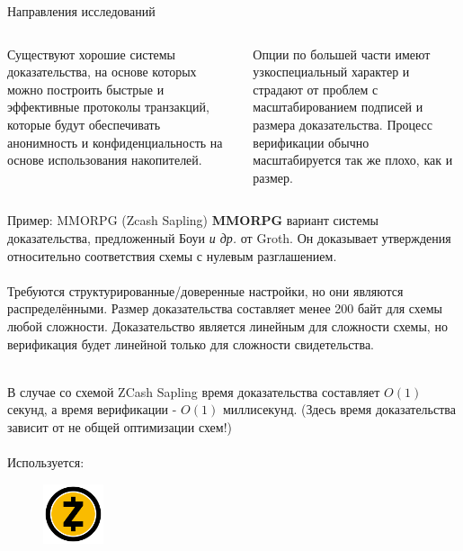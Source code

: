 \documentclass[aspectratio=169]{beamer}
\begin{document}
\begin{frame}{Направления исследований}
\begin{figure}
\end{figure}
\begin{columns}
\begin{column}{0.5\textwidth}
Существуют хорошие системы доказательства, на основе которых можно построить быстрые и эффективные протоколы транзакций, которые будут обеспечивать анонимность и конфиденциальность на основе использования накопителей.
\end{column}
\begin{column}{0.5\textwidth}
Опции по большей части имеют узкоспециальный характер и страдают от проблем с масштабированием подписей и размера доказательства. Процесс верификации обычно масштабируется так же плохо, как и размер.
\end{column}
\end{columns}
\end{frame}


\begin{frame}{Пример: MMORPG (Zcash Sapling)}
\textbf{MMORPG} вариант системы доказательства, предложенный Боуи \textit{и др.} от Groth. Он доказывает утверждения относительно соответствия схемы с нулевым разглашением. \\~\\

Требуются структурированные/доверенные настройки, но они являются распределёнными. Размер доказательства составляет менее 200 байт для схемы любой сложности. Доказательство является линейным для сложности схемы, но верификация будет линейной только для сложности свидетельства. \\~\\
\end{frame}
\begin{frame}
В случае со схемой ZCash Sapling время доказательства составляет $O(1)$ секунд, а время верификации - $O(1)$ миллисекунд. (Здесь время доказательства зависит от не общей оптимизации схем!) \\~\\

Используется:
\begin{figure}
\includegraphics[height=50pt]{zcash.png}
\end{figure}
\end{frame}
\end{document}

